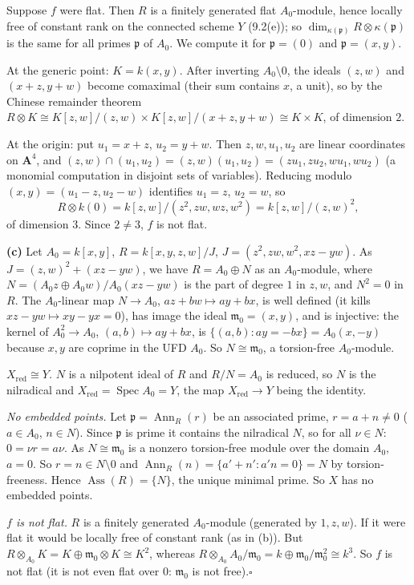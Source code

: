 \documentclass[11pt]{article}
\begin{document}
Suppose $f$ were flat. Then $R$ is a finitely generated flat $A_0$-module, hence locally free of constant rank on the connected scheme $Y$ (9.2(e)); so $\dim_{\kappa(\mathfrak p)}R\otimes\kappa(\mathfrak p)$ is the same for all primes $\mathfrak p$ of $A_0$. We compute it for $\mathfrak p=(0)$ and $\mathfrak p=(x,y)$.

At the generic point: $K=k(x,y)$. After inverting $A_0\setminus0$, the ideals $(z,w)$ and $(x+z,y+w)$ become comaximal (their sum contains $x$, a unit), so by the Chinese remainder theorem $R\otimes K\cong K[z,w]/(z,w)\times K[z,w]/(x+z,y+w)\cong K\times K$, of dimension $2$.

At the origin: put $u_1=x+z$, $u_2=y+w$. Then $z,w,u_1,u_2$ are linear coordinates on $\mathbf A^4$, and $(z,w)\cap(u_1,u_2)=(z,w)(u_1,u_2)=(zu_1,zu_2,wu_1,wu_2)$ (a monomial computation in disjoint sets of variables). Reducing modulo $(x,y)=(u_1-z,u_2-w)$ identifies $u_1=z$, $u_2=w$, so
\[
R\otimes k(0)=k[z,w]/(z^2,zw,wz,w^2)=k[z,w]/(z,w)^2,
\]
of dimension $3$. Since $2\ne3$, $f$ is not flat.

\textbf{(c)} Let $A_0=k[x,y]$, $R=k[x,y,z,w]/J$, $J=(z^2,zw,w^2,xz-yw)$. As $J=(z,w)^2+(xz-yw)$, we have $R=A_0\oplus N$ as an $A_0$-module, where $N=(A_0z\oplus A_0w)/A_0(xz-yw)$ is the part of degree $1$ in $z,w$, and $N^2=0$ in $R$. The $A_0$-linear map $N\to A_0$, $az+bw\mapsto ay+bx$, is well defined (it kills $xz-yw\mapsto xy-yx=0$), has image the ideal $\mathfrak m_0=(x,y)$, and is injective: the kernel of $A_0^2\to A_0$, $(a,b)\mapsto ay+bx$, is $\{(a,b):ay=-bx\}=A_0(x,-y)$ because $x,y$ are coprime in the UFD $A_0$. So $N\cong\mathfrak m_0$, a torsion-free $A_0$-module.

\emph{$X_{\mathrm{red}}\cong Y$.} $N$ is a nilpotent ideal of $R$ and $R/N=A_0$ is reduced, so $N$ is the nilradical and $X_{\mathrm{red}}=\operatorname{Spec}A_0=Y$, the map $X_{\mathrm{red}}\to Y$ being the identity.

\emph{No embedded points.} Let $\mathfrak p=\operatorname{Ann}_R(r)$ be an associated prime, $r=a+n\ne0$ ($a\in A_0$, $n\in N$). Since $\mathfrak p$ is prime it contains the nilradical $N$, so for all $\nu\in N$: $0=\nu r=a\nu$. As $N\cong\mathfrak m_0$ is a nonzero torsion-free module over the domain $A_0$, $a=0$. So $r=n\in N\setminus0$ and $\operatorname{Ann}_R(n)=\{a'+n':a'n=0\}=N$ by torsion-freeness. Hence $\operatorname{Ass}(R)=\{N\}$, the unique minimal prime. So $X$ has no embedded points.

\emph{$f$ is not flat.} $R$ is a finitely generated $A_0$-module (generated by $1,z,w$). If it were flat it would be locally free of constant rank (as in (b)). But $R\otimes_{A_0}K=K\oplus\mathfrak m_0\otimes K\cong K^2$, whereas $R\otimes_{A_0}A_0/\mathfrak m_0=k\oplus\mathfrak m_0/\mathfrak m_0^2\cong k^3$. So $f$ is not flat (it is not even flat over $0$: $\mathfrak m_0$ is not free).\hfill$\square$
\end{document}
